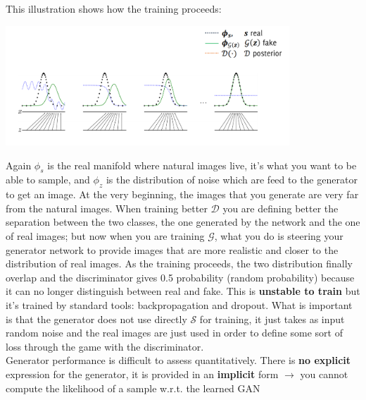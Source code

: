 This illustration shows how the training proceeds:
\begin{center}
    \includegraphics[width=0.8\textwidth]{images/gan_training.PNG}\par
\end{center}
Again $\phi_{s}$ is the real manifold where natural images live, it's what you want to be able to sample, and $\phi_{z}$ is the distribution of noise which are feed to the generator to get an image. At the very beginning, the images that you generate are very far from the natural images. When training better $\mathcal{D}$ you are defining better the separation between the two classes, the one generated by the network and the one of real images; but now when you are training $\mathcal{G}$, what you do is steering your generator network to provide images that are more realistic and closer to the distribution of real images. As the training proceeds, the two distribution finally overlap and the discriminator gives 0.5 probability (random probability) because it can no longer distinguish between real and fake. This is \textbf{unstable to train} but it's trained by standard tools: backpropagation and dropout. What is important is that the generator does not use directly $\mathcal{S}$ for training, it just takes as input random noise and the real images are just used in order to define some sort of loss through the game with the discriminator.\\
Generator performance is difficult to assess quantitatively. There is \textbf{no explicit} expression for the generator, it is provided in an \textbf{implicit} form $\rightarrow$ you cannot compute the likelihood of a sample w.r.t. the learned GAN